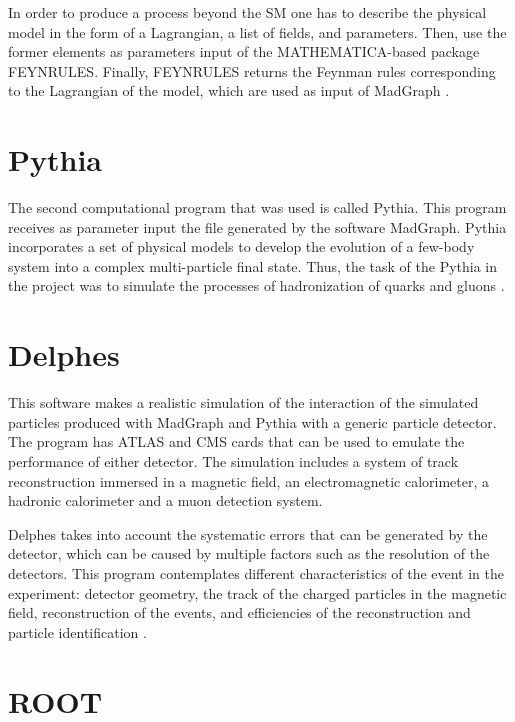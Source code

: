 In order to produce a process beyond the SM one has to describe the physical model in the form of a Lagrangian, a list of fields, and parameters. Then, use the former elements as parameters
input of the MATHEMATICA-based package FEYNRULES. Finally, FEYNRULES returns the Feynman rules corresponding to the Lagrangian of the model, which are used as input of MadGraph \cite{MadGraph 2}.


\section{Pythia}

The second computational program that was used is called Pythia. This program receives as parameter input the file generated by the software MadGraph. Pythia incorporates a set of physical models 
to develop the evolution of a few-body system into a complex multi-particle final state. Thus, the task of the Pythia in the project was to simulate the processes of hadronization of quarks and 
gluons \cite{Pythia}.


\section{Delphes}

This software makes a realistic simulation of the interaction of the simulated particles produced with MadGraph and Pythia with a generic particle detector. The program has ATLAS and CMS cards that can be used to emulate the performance of either detector. The simulation includes a system of track reconstruction immersed in a magnetic field, an electromagnetic calorimeter, a hadronic 
calorimeter and a muon detection system.

Delphes takes into account the systematic errors that can be generated by the detector, which can be caused by multiple factors such as the resolution of the detectors. This program contemplates
different characteristics of the event in the experiment: detector geometry, the track of the charged particles in the magnetic field, reconstruction of the events, and efficiencies of the
reconstruction and particle identification \cite{Delphes}. 

\section{ROOT}


